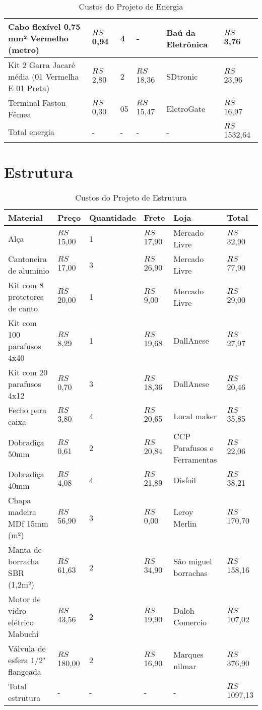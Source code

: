 \begin{table}[H]
\centering
\begin{tabular}{| m{4cm}|m{2cm}|m{2cm}|m{2cm}|m{2cm}|m{2cm}|}
\hline
Cabo flexível 0,75 mm² Vermelho (metro) & $RS$ 0,94 & 4 & - & Baú da Eletrônica & $RS$ 3,76 \\\hline
Kit 2 Garra Jacaré média (01 Vermelha E 01 Preta) & $RS$ 2,80 & 2 & $RS$ 18,36 & SDtronic & $RS$ 23,96 \\\hline
Terminal Faston Fêmea & $RS$ 0,30 & 05   & $RS$ 15,47 & EletroGate &   $RS$ 16,97   \\\hline

Total energia & - & - & - & - & $RS$ 1532,64 \\\hline
\end{tabular}
\caption{Custos do Projeto de Energia}
\label{tab:custos_ener}
\end{table}

\section{Estrutura}

\begin{table}[h!]
\centering
\begin{tabular}{| m{4cm}|m{2cm}|m{2cm}|m{2cm}|m{2cm}|m{2cm}|}
\hline
Material & Preço  & Quantidade & Frete & Loja & Total  \\ 
\hline
Alça & $RS$ 15,00 & 1 & $RS$ 17,90 & Mercado Livre & $RS$ 32,90 \\ \hline
Cantoneira de alumínio & $RS$ 17,00 & 3 & $RS$ 26,90 & Mercado Livre & $RS$ 77,90 \\ \hline
Kit com 8 protetores de canto & $RS$ 20,00 & 1 & $RS$ 9,00 & Mercado Livre & $RS$ 29,00 \\ \hline
Kit com 100 parafusos 4x40 & $RS$ 8,29 & 1 & $RS$ 19,68 & DallAnese & $RS$ 27,97 \\ \hline
Kit com 20 parafusos 4x12 & $RS$ 0,70 & 3 & $RS$ 18,36 & DallAnese & $RS$ 20,46 \\ \hline
Fecho para caixa & $RS$ 3,80 & 4 & $RS$ 20,65 & Local maker & $RS$ 35,85 \\ \hline
Dobradiça 50mm & $RS$ 0,61 & 2 & $RS$ 20,84 & CCP Parafusos e Ferramentas & $RS$ 22,06 \\ \hline
Dobradiça 40mm & $RS$ 4,08 & 4 & $RS$ 21,89 & Disfoil & $RS$ 38,21 \\ \hline
Chapa madeira MDf 15mm (m²) & $RS$ 56,90 & 3 & $RS$ 0,00 & Leroy Merlin & $RS$ 170,70 \\ \hline
Manta de borracha SBR (1,2m²) & $RS$ 61,63 & 2 & $RS$ 34,90 & São miguel borrachas & $RS$ 158,16 \\ \hline 
Motor de vidro elétrico Mabuchi & $RS$ 43,56 & 2 & $RS$ 19,90 & Daloh Comercio & $RS$ 107,02 \\ \hline
Válvula de esfera 1/2" flangeada & $RS$ 180,00 & 2 & $RS$ 16,90 & Marques nilmar & $RS$ 376,90 \\ \hline
Total estrutura & - & - & - & - & $RS$ 1097,13 \\ \hline
\end{tabular}
\caption{Custos do Projeto de Estrutura}
\label{tab:custos_estrutura}
\end{table}

